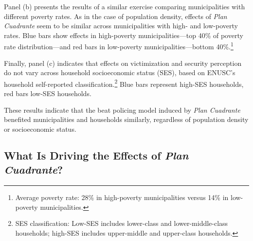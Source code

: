 Panel (b) presents the results of a similar exercise comparing municipalities with different poverty rates. As in the case of population density, effects of \emph{Plan Cuadrante} seem to be similar across municipalities with high- and low-poverty rates. Blue bars show effects in high-poverty municipalities---top 40\% of poverty rate distribution---and red bars in low-poverty municipalities---bottom 40\%.\footnote{Average poverty rate: 28\% in high-poverty municipalities versus 14\% in low-poverty municipalities.}

Finally, panel (c) indicates that effects on victimization and security perception do not vary across household socioeconomic status (SES), based on ENUSC's household self-reported classification.\footnote{SES classification: Low-SES includes lower-class and lower-middle-class households; high-SES includes upper-middle and upper-class households.} Blue bars represent high-SES households, red bars low-SES households.

These results indicate that the beat policing model induced by \emph{Plan Cuadrante} benefited municipalities and households similarly, regardless of population density or socioeconomic status.


\subsection{What Is Driving the Effects of \emph{Plan Cuadrante}?}%
\label{mechanisms}




